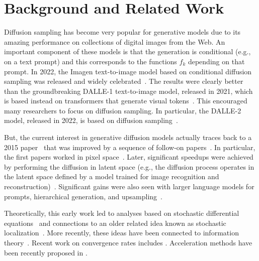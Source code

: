 \section{Background and Related Work}
Diffusion sampling has become very popular for generative models due to its amazing performance on collections of digital images from the Web.
An important component of these models is that the generation is conditional (e.g., on a text prompt) and this corresponds to the functions $f_k$ depending on that prompt.
In 2022, the Imagen text-to-image model based on conditional diffusion sampling was released and widely celebrated~\cite{Saharia-neurips22}.
The results were clearly better than the groundbreaking DALLE-1 text-to-image model, released in 2021, which is based instead on transformers that generate visual tokens~\cite{Ramesh-icml21}.
This encouraged many researchers to focus on diffusion sampling.
In particular, the DALLE-2 model, released in 2022, is based on diffusion sampling~\cite{ramesh-arxiv22}.

But, the current interest in generative diffusion models actually traces back to a 2015 paper~\cite{Sohl-icml15} that was improved by a sequence of follow-on papers~\cite{Ho-neurips20,Nichol-icml22,Rombach-cvpr22}. In particular, the first papers worked in pixel space~\cite{Ho-neurips20,Nichol-icml22}. Later, significant speedups were achieved by performing the diffusion in latent space (e.g., the diffusion process operates in the latent space defined by a model trained for image recognition and reconstruction)~\cite{Rombach-cvpr22}. Significant gains were also seen with larger language models for prompts, hierarchical generation, and upsampling~\cite{Saharia-neurips22}.

Theoretically, this early work led to analyses based on stochastic differential equations~\cite{Song-iclr21} and connections to an older related idea known as stochastic localization~\cite{Eldan-gafa13,Chen-focs22}.
More recently, these ideas have been connected to information theory~\cite{Alaoui-it22,Montanari-arxiv23}. Recent work on convergence rates includes \cite{lee:2023convergence,chen:2023sampling,chen:2023improved,benton:2024nearly,li:2024towards,li:2024accelerating}. 
Acceleration methods have been recently proposed in  \cite{wu2024:stochastic,li:2024provable}.